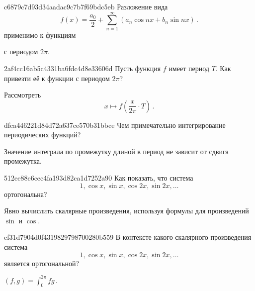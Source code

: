 \begin{note}{c6879c7d93d34aadac9c7b7f69bdc5eb}
    Разложение вида
    \[
        f(x) = \frac{a_0}{2} + \sum_{n=1}^{\infty} (a_n \cos nx + b_n \sin nx)\,.
    \]
    применимо к функциям \begin{icloze}{1}с периодом \({ 2\pi }\).\end{icloze}
\end{note}

\begin{note}{2af4cc16ab5c4331ba6fdc4d8e33606d}
    Пусть функция \({ f }\) имеет период \({ T }\).
    Как привезти её к функции с периодом \({ 2\pi }\)?

    \begin{cloze}{1}
        Рассмотреть
        \[
            x \mapsto f\left( \frac{x}{2\pi} \cdot T \right)\,.
        \]
    \end{cloze}
\end{note}

\begin{note}{dfca446221d84d72a637ce570b31bbce}
    Чем примечательно интегрирование периодических функций?

    \begin{cloze}{1}
        Значение интеграла по промежутку длиной в период не зависит от сдвига промежутка.
    \end{cloze}
\end{note}

\begin{note}{512ee88e6cec4fa193d82ca1d7252a90}
    Как показать, что система
    \[
        1, \cos x, \sin x, \cos 2x, \sin 2x, \ldots
    \]
    ортогональна?

    \begin{cloze}{1}
        Явно вычислить скалярные произведения, используя формулы для произведений \({ \sin }\) и \({ \cos }\).
    \end{cloze}
\end{note}

\begin{note}{cf31d7904d0f4319829798700280b559}
    В контексте какого скалярного произведения система
    \[
        1, \cos x, \sin x, \cos 2x, \sin 2x, \ldots
    \]
    является ортогональной?

    \begin{cloze}{1}
        \({ \displaystyle (f, g) = \int_{0}^{2\pi} f g }\)\,.
    \end{cloze}
\end{note}

